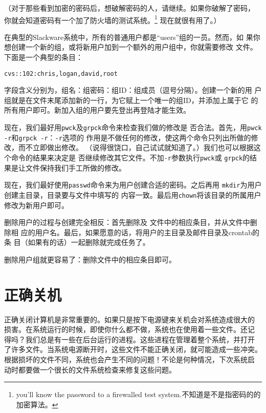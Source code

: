 （对于那些看到加密的密码后，想破解密码的人，请继续。如果你破解了密码，
你就会知道密码有一个加了防火墙的测试系统。\footnote{you'll know the
password to a firewalled test system.不知道是不是指密码的的加密算法。}
现在就很有用了。）

在典型的Slackware系统中，所有的普通用户都是``users''组的一员。然而，如
果你想创建一个新的组，或将新用户加到一个额外的用户组中，你就需要修改
文件。下面是一个典型的条目：
\begin{Verbatim}[frame=single, commandchars=\\\{\}]
cvs::102:chris,logan,david,root
\end{Verbatim}
字段含义分别为，组名：组密码：组ID：组成员（逗号分隔）。创建一个新的用
户组就是在文件末尾添加新的一行，为它赋上一个唯一的组ID，并添加上属于它
的所有用户即可。新加入组的用户要先登出再登陆才能生效。

现在，我们最好用\texttt{pwck}及\texttt{grpck}命令来检查我们做的修改是
否合法。首先，用\texttt{pwck -r}和\texttt{grpck -r}：\texttt{-r}选项的
作用是不做任何的修改，使这两个命令只列出所做的修改，而不立即做出修改。
（说得很饶口，自己试试就知道了。）我们也可以根据这个命令的结果来决定是
否继续修改其它文件。不加\texttt{-r}参数执行\texttt{pwck}或
\texttt{grpck}的结果是让文件保持我们手工所做的修改。

现在，我们最好使用\texttt{passwd}命令来为用户创建合适的密码。之后再用
\texttt{mkdir}为用户创建主目录，目录要与文件中填写的
内容一致。最后用\texttt{chown}将该目录的所属用户修改为新用户即可。

删除用户的过程与创建完全相反：首先删除及
文件中的相应条目，并从文件中删除相
应的用户名。最后，如果愿意的话，将用户的主目录及邮件目录及crontab的条
目（如果有的话）一起删除就完成任务了。

删除用户组就更容易了：删除文件中的相应条目即可。

\section{正确关机}
\label{sec:systemAdministration:shuttingDown}
正确关闭计算机是非常重要的。如果只是按下电源键来关机会对系统造成很大的
损害。在系统运行的时候，即使你什么都不做，系统也在使用着一些文件。还记
得吗？我们总是有一些在后台运行的进程。这些进程在管理着整个系统，并打开
了许多文件。当系统电源断开时，这些文件不能正确关闭，就可能造成一些冲突。
根据损坏的文件不同，系统也会产生不同的问题！不论是何种情况，下次系统启
动时都要做一个很长的文件系统检查来修复这些问题。

